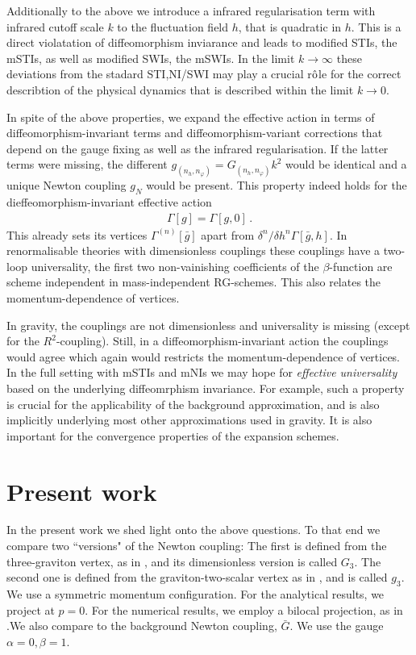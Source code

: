 \documentclass[11pt]{book} %
\numberwithin{equation}{chapter}
\begin{document}
Additionally to the above we introduce a infrared regularisation term
with infrared cutoff scale $k$ to the fluctuation field $h$, that is
quadratic in $h$. This is a direct violatation of diffeomorphism
inviarance and leads to modified STIs, the mSTIs, as well as modified
SWIs, the mSWIs. In the limit $k\to\infty$ these deviations from the
stadard STI,NI/SWI may play a crucial r$\hat{\rm o}$le for the correct
describtion of the physical dynamics that is described within the
limit $k\to 0$.

In spite of the above properties, we expand the effective action in
terms of diffeomorphism-invariant terms and diffeomorphism-variant
corrections that depend on the gauge fixing as well as the infrared
regularisation. If the latter terms were missing, the different
$g_{(n_h,n_\varphi)}=G_{(n_h,n_\varphi)} k^2$ would be identical and a
unique Newton coupling $g_N$ would be present. This property indeed
holds for the dieffeomorphism-invariant effective action
\begin{align}
\Gamma[g]= \Gamma[g,0]\,.
\end{align}
This already sets its vertices $\Gamma^{(n)}[\bar g]$ apart from
$\delta^n/\delta h^n \Gamma[\bar g,h]$. In renormalisable theories with
dimensionless couplings these couplings have a two-loop universality,
the first two non-vainishing coefficients of the $\beta$-function are
scheme independent in mass-independent RG-schemes. This also relates
the momentum-dependence of vertices.

In gravity, the couplings are not dimensionless and universality is
missing (except for the $R^2$-coupling). Still, in a
diffeomorphism-invariant action the couplings would agree which again
would restricts the momentum-dependence of vertices. In the full
setting with mSTIs and mNIs we may hope for {\it effective
  universality} based on the underlying diffeomrphism invariance. For
example, such a property is crucial for the applicability of the
background approximation, and is also implicitly underlying most other
approximations used in gravity. It is also important for the
convergence properties of the expansion schemes.


\section{Present work}

In the present work we shed light onto the above questions. To that end
we compare two ``versions" of the Newton coupling: The first is
defined from the three-graviton vertex, as in
\cite{Christiansen:2015rva,Meibohm:2015twa}, and its dimensionless
version is called $G_3$. The second one is defined from the
graviton-two-scalar vertex as in \cite{Dona:2015tnf}, and is called
$g_3$. We use a symmetric momentum configuration. For the analytical
results, we project at $p=0$. For the numerical results, we employ a
bilocal projection, as in
\cite{Christiansen:2015rva,Meibohm:2015twa}.\newline We also compare
to the background Newton coupling, $\bar{G}$. We use the gauge
$\alpha=0, \beta=1$.
\end{document}

